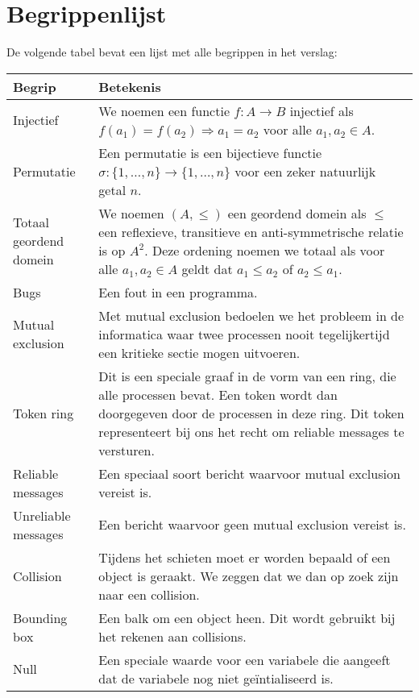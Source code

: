 \section{Begrippenlijst}
\label{app:begrippen}
De volgende tabel bevat een lijst met alle begrippen in het verslag:
    \begin{table}[H]
        \small
        \centering
        \begin{tabular}{| l | p{12cm} |}
        \hline
        Begrip & Betekenis \\ \hline
        Injectief & We noemen een functie $f: A \rightarrow B$ injectief als $f(a_1) = f(a_2) \Rightarrow a_1 = a_2$ voor
            alle $a_1, a_2 \in A$. \\ \hline
        Permutatie & Een permutatie is een bijectieve functie $\sigma: \{1, \ldots, n\} \rightarrow \{1, \ldots, n\}$
            voor een zeker natuurlijk getal $n$. \\ \hline
        Totaal geordend domein & We noemen $(A, \leq)$ een geordend domein als $\leq$ een reflexieve, transitieve en
            anti-symmetrische relatie is op $A^2$. Deze ordening noemen we totaal als voor alle $a_1, a_2 \in A$ geldt dat $a_1 \leq a_2$
            of $a_2 \leq a_1$. \\ \hline
        Bugs & Een fout in een programma. \\ \hline
        Mutual exclusion & Met mutual exclusion bedoelen we het probleem in de informatica waar twee processen nooit tegelijkertijd
            een kritieke sectie mogen uitvoeren. \\ \hline
        Token ring & Dit is een speciale graaf in de vorm van een ring, die alle processen bevat. Een token wordt dan doorgegeven
            door de processen in deze ring. Dit token representeert bij ons het recht om reliable messages te versturen. \\ \hline
        Reliable messages & Een speciaal soort bericht waarvoor mutual exclusion vereist is. \\ \hline
        Unreliable messages & Een bericht waarvoor geen mutual exclusion vereist is. \\ \hline
        Collision & Tijdens het schieten moet er worden bepaald of een object is geraakt. We zeggen dat we dan op zoek zijn
            naar een collision. \\ \hline
        Bounding box & Een balk om een object heen. Dit wordt gebruikt bij het rekenen aan collisions. \\ \hline
        Null & Een speciale waarde voor een variabele die aangeeft dat de variabele nog niet ge\"intialiseerd is. \\ \hline

\end{tabular}
\end{table}
